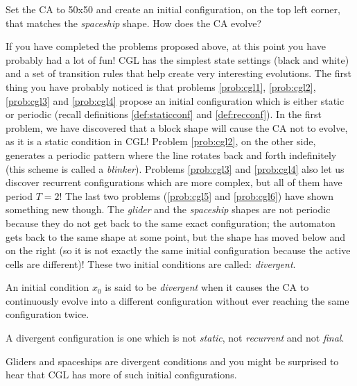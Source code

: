 \begin{problem}
\label{prob:cgl6}
Set the CA to 50x50 and create an initial configuration, on the top left corner, that
matches the \textit{spaceship} shape. How does the CA evolve?
\end{problem}

If you have completed the problems proposed above, at this point you have probably had
a lot of fun! CGL has the simplest state settings (black and white) and a set of
transition rules that help create very interesting evolutions. The first thing you have probably
noticed is that problems \ref{prob:cgl1}, \ref{prob:cgl2}, \ref{prob:cgl3} and \ref{prob:cgl4}
propose an initial configuration which is either static or periodic (recall definitions
\ref{def:staticconf} and \ref{def:recconf}). 
In the first problem, we have discovered that a block shape will cause the CA not to evolve,
as it is a static condition in CGL!
Problem \ref{prob:cgl2}, on the other side, generates a periodic pattern where the line rotates
back and forth indefinitely (this scheme is called a \textit{blinker}). Problems
\ref{prob:cgl3} and \ref{prob:cgl4} also let us discover recurrent configurations which are more
complex, but all of them have period $T=2$!
The last two problems (\ref{prob:cgl5} and \ref{prob:cgl6}) have shown something new though. The
\textit{glider} and the \textit{spaceship} shapes are not periodic because they do not get back
to the same exact configuration; the automaton gets back to the same shape at some point,
but the shape has moved below and on the right (so it is not exactly the same initial
configuration because the active cells are different)!
These two initial conditions are called: \textit{divergent}.

\begin{definition}
\label{def:divconf}
An initial condition $x_0$ is said to be
\textit{divergent} when it causes the CA to continuously evolve
into a different configuration without ever reaching the same configuration twice.
\end{definition}

\begin{proposition}
A divergent configuration is one which is not \textit{static}, not \textit{recurrent} and not
\textit{final}.
\end{proposition}

Gliders and spaceships are divergent conditions and you might be surprised to hear that
CGL has more of such initial configurations.

